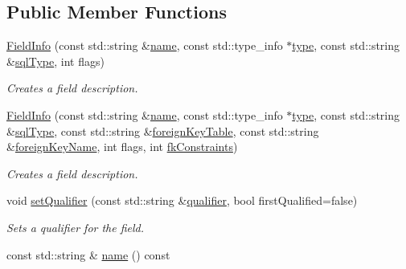 \subsection*{Public Member Functions}
\begin{DoxyCompactItemize}
\item 
\hyperlink{classdbo_1_1mapping_1_1_field_info_a8763d05cee7a73c3b60cb133467c65b2}{Field\+Info} (const std\+::string \&\hyperlink{classdbo_1_1mapping_1_1_field_info_aa684340deb7dabfb5eab22c4589c7476}{name}, const std\+::type\+\_\+info $\ast$\hyperlink{classdbo_1_1mapping_1_1_field_info_a4321bb42c7c9d8296db5180b94a736f6}{type}, const std\+::string \&\hyperlink{classdbo_1_1mapping_1_1_field_info_a29f7e7f762345f1915033a9a456cd5d0}{sql\+Type}, int flags)
\begin{DoxyCompactList}\small\item\em Creates a field description. \end{DoxyCompactList}\item 
\hyperlink{classdbo_1_1mapping_1_1_field_info_acca8ec52e6b2d6f1810d499b30dd1aaa}{Field\+Info} (const std\+::string \&\hyperlink{classdbo_1_1mapping_1_1_field_info_aa684340deb7dabfb5eab22c4589c7476}{name}, const std\+::type\+\_\+info $\ast$\hyperlink{classdbo_1_1mapping_1_1_field_info_a4321bb42c7c9d8296db5180b94a736f6}{type}, const std\+::string \&\hyperlink{classdbo_1_1mapping_1_1_field_info_a29f7e7f762345f1915033a9a456cd5d0}{sql\+Type}, const std\+::string \&\hyperlink{classdbo_1_1mapping_1_1_field_info_ac90a4d26a0c091ba0a93960a8d8a8464}{foreign\+Key\+Table}, const std\+::string \&\hyperlink{classdbo_1_1mapping_1_1_field_info_adbc55f9c113054bed81ed7dd22aca09a}{foreign\+Key\+Name}, int flags, int \hyperlink{classdbo_1_1mapping_1_1_field_info_ae7700af51bf1672d8d2db4a52b885c4d}{fk\+Constraints})
\begin{DoxyCompactList}\small\item\em Creates a field description. \end{DoxyCompactList}\item 
void \hyperlink{classdbo_1_1mapping_1_1_field_info_adc3ba59211a120f92f09bfefa43a65b0}{set\+Qualifier} (const std\+::string \&\hyperlink{classdbo_1_1mapping_1_1_field_info_a3891d63e2efd86128fd6f6ae10979b22}{qualifier}, bool first\+Qualified=false)
\begin{DoxyCompactList}\small\item\em Sets a qualifier for the field. \end{DoxyCompactList}\item 
const std\+::string \& \hyperlink{classdbo_1_1mapping_1_1_field_info_aa684340deb7dabfb5eab22c4589c7476}{name} () const 

\end{DoxyCompactItemize}
